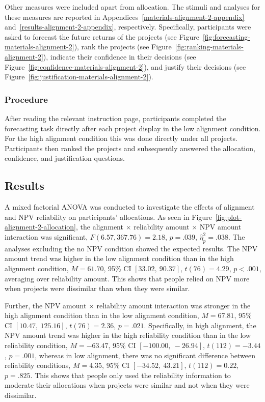 \documentclass[a4paper, nobind, dvipsnames]{templates/ociamthesis}
\theoremstyle{definition}
\theoremstyle{definition}
\theoremstyle{definition}
\theoremstyle{definition}
\theoremstyle{remark}
\begin{document}
Other measures were included apart from allocation. The stimuli and analyses for
these measures are reported in Appendices~\ref{materials-alignment-2-appendix}
and~\ref{results-alignment-2-appendix}, respectively. Specifically,
participants were asked to forecast the future returns of the projects (see
Figure~\ref{fig:forecasting-materials-alignment-2}), rank the projects (see
Figure~\ref{fig:ranking-materials-alignment-2}), indicate their confidence in
their decisions (see Figure~\ref{fig:confidence-materials-alignment-2}), and
justify their decisions (see
Figure~\ref{fig:justification-materials-alignment-2}).

\subsubsection{Procedure}

After reading the relevant instruction page, participants completed the
forecasting task directly after each project display in the low alignment
condition. For the high alignment condition this was done directly under all
projects. Participants then ranked the projects and subsequently answered the
allocation, confidence, and justification questions.

\subsection{Results}

A mixed factorial ANOVA was conducted to investigate the effects of alignment
and NPV reliability on participants' allocations. As seen in
Figure~\ref{fig:plot-alignment-2-allocation}, the alignment \(\times\)
reliability amount \(\times\) NPV amount interaction was significant,
\(F(6.57, 367.76) = 2.18\), \(p = .039\), \(\hat{\eta}^2_p = .038\). The
analyses excluding the no NPV condition showed the expected results. The NPV
amount trend was higher in the low alignment condition than in the high
alignment condition, \(M = 61.70\), 95\% CI \([33.02,~90.37]\), \(t(76) = 4.29\), \(p < .001\),
averaging over reliability amount. This shows that people relied on NPV more
when projects were dissimilar than when they were similar.

Further, the NPV amount \(\times\) reliability amount interaction was
stronger in the high alignment condition than in the low alignment condition,
\(M = 67.81\), 95\% CI \([10.47,~125.16]\), \(t(76) = 2.36\), \(p = .021\). Specifically, in
high alignment, the NPV amount trend was higher in the high reliability
condition than in the low reliability condition,
\(M = -63.47\), 95\% CI \([-100.00,~-26.94]\), \(t(112) = -3.44\), \(p = .001\), whereas in low
alignment, there was no significant difference between reliability conditions,
\(M = 4.35\), 95\% CI \([-34.52,~43.21]\), \(t(112) = 0.22\), \(p = .825\). This shows that people
only used the reliability information to moderate their allocations when
projects were similar and not when they were dissimilar.
\end{document}
